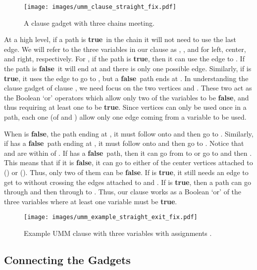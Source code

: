 \documentclass{article}[11pt]
\newcommand{\true}{\textbf{true}}
\newcommand{\false}{\textbf{false}}
\begin{document}
\begin{figure}[!ht]
\centering
    \texttt{[image: images/umm\_clause\_straight\_fix.pdf]}
\caption{A clause gadget with three chains meeting.}
    \label{fig:umm_clause}
\end{figure}


At a high level, if a path is \true\ in the chain it will not need to use
the last edge.  We will refer to the three variables in our clause as , , and 
 for left, center, and right, respectively.  For , if the path is \true, then
it can use the edge to .  If the path is \false\ it will end at  and there is
only one possible edge.  Similarly, if  is \true, it uses the edge to go to
, but a \false\ path ends at .
In understanding the clause gadget of clause , we need focus on the two vertices
 and . These two act as the Boolean `or' operators which allow only two of the
variables to be \false, and thus requiring at least one to be \true.  Since vertices can
only be used once in a path, each one (of  and ) allow only one edge coming
from a variable to be used.

When  is \false, the path ending at , it must follow onto  and then
go to .  Similarly, if  has a \false\ path ending at , it must follow 
onto  and then go to .  Notice that  and  are within 
of .  If  has a \false\ path, then it can go from  to  or go to
 and then .  This means that if it is \false, it can go to either of the 
center vertices attached to  () or  ().  Thus, only two of them
can be \false.  If  is \true, it still needs an edge
to get to  without crossing the edges attached to  and .  If 
is \true, then a path can go through  and then through  to .
Thus, our clause works as a Boolean `or' of the three variables where at least one
variable must be \true.



\begin{figure}[!ht]
\centering
\texttt{[image: images/umm\_example\_straight\_exit\_fix.pdf]}
\caption{Example UMM clause with three variables  with assignments  
     .}
    \label{fig:umm_example}
\end{figure}





\subsection{Connecting the Gadgets}
\end{document}
